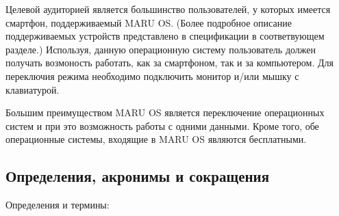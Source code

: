 \documentclass[a4paper, 14pt]{article}
\begin{document}
\par Целевой аудиторией является большинство пользователей, у которых имеется смартфон, поддерживаемый MARU OS. (Более подробное описание поддерживаемых устройств представлено в спецификации в соответвующем разделе.) Используя, данную операционную систему пользователь должен получать возмоность работать, как за смартфоном, так и за компьютером. Для переключия режима необходимо подключить монитор и/или мышку с клавиатурой. 
\par Большим преимуществом MARU OS является переключение операционных систем и при это возможность работы с одними данными. Кроме того, обе операционные системы, входящие в MARU OS являются бесплатными.


\subsection{Определения, акронимы и сокращения}

\par Определения и термины:
\end{document}
